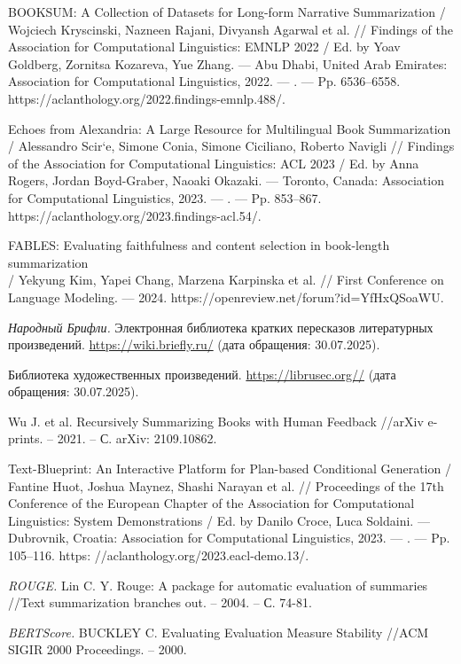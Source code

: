 \documentclass{article}
\begin{document}
\begin{thebibliography}{99}
BOOKSUM: A Collection of Datasets for Long-form Narrative Summarization / Wojciech Kryscinski, Nazneen Rajani, Divyansh Agarwal et al. // Findings of the Association for Computational Linguistics: EMNLP 2022 / Ed. by Yoav Goldberg, Zornitsa Kozareva, Yue Zhang. — Abu Dhabi, United Arab Emirates: Association for Computational Linguistics, 2022. — . — Pp. 6536–6558. https://aclanthology.org/2022.findings-emnlp.488/.

Echoes from Alexandria: A Large Resource for Multilingual Book Summarization / Alessandro Scir`e, Simone Conia, Simone Ciciliano, Roberto Navigli // Findings of the Association for Computational Linguistics: ACL 2023 / Ed. by Anna Rogers, Jordan Boyd-Graber, Naoaki Okazaki. — Toronto, Canada: Association for Computational Linguistics, 2023. — . — Pp. 853–867. https://aclanthology.org/2023.findings-acl.54/.

FABLES: Evaluating faithfulness and content selection in book-length summarization \\/ Yekyung Kim, Yapei Chang, Marzena Karpinska et al. // First Conference on Language Modeling. — 2024. https://openreview.net/forum?id=YfHxQSoaWU.

\textit{Народный Брифли.}  
Электронная библиотека кратких пересказов литературных произведений.  
\url{https://wiki.briefly.ru/} (дата обращения: 30.07.2025).

Библиотека художественных произведений.  
\url{https://librusec.org//} (дата обращения: 30.07.2025).

Wu J. et al. Recursively Summarizing Books with Human Feedback //arXiv e-prints. – 2021. – С. arXiv: 2109.10862.

Text-Blueprint: An Interactive Platform for Plan-based Conditional Generation / Fantine Huot, Joshua Maynez, Shashi Narayan et al. // Proceedings of the 17th Conference of the European Chapter of the Association for Computational Linguistics:
System Demonstrations / Ed. by Danilo Croce, Luca Soldaini. — Dubrovnik, Croatia: Association for Computational Linguistics, 2023. — . — Pp. 105–116. https:
//aclanthology.org/2023.eacl-demo.13/.

\textit{ROUGE.}
Lin C. Y. Rouge: A package for automatic evaluation of summaries //Text summarization branches out. – 2004. – С. 74-81.

\textit{BERTScore.}
BUCKLEY C. Evaluating Evaluation Measure Stability //ACM SIGIR 2000 Proceedings. – 2000.


\end{thebibliography}
\end{document}
